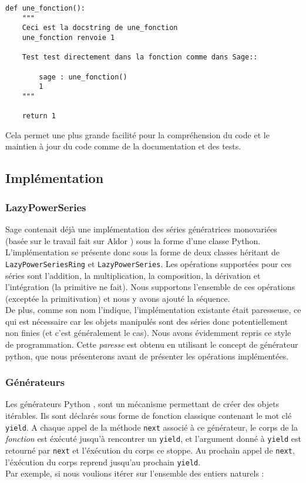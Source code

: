 \documentclass[12pt]{article}
\begin{document}
\noindent\begin{minipage}{\linewidth}
\begin{lstlisting}
def une_fonction():
    """
    Ceci est la docstring de une_fonction
    une_fonction renvoie 1
    
    Test test directement dans la fonction comme dans Sage::

        sage : une_fonction()
        1
    """

    return 1
\end{lstlisting}
\end{minipage}
Cela permet une plus grande facilité pour la compréhension du code et le
maintien à jour du code comme de la documentation et des tests.


\subsection{Implémentation}

\subsubsection{LazyPowerSeries}
Sage contenait déjà une implémentation des séries génératrices monovariées
(basée sur le travail fait sur Aldor
\cite{Hemmecke+Rubey:Aldor-Combinat:2006}) sous la forme d'une classe
Python. L'implémentation se présente donc sous la forme de deux classes
héritant de \verb|LazyPowerSeriesRing| et \verb|LazyPowerSeries|. Les
opérations supportées pour ces séries sont l'addition, la multiplication, la
composition, la dérivation et l'intégration (la primitive ne fait). Nous
supportons l'ensemble de ces opérations (exceptée la primitivation) et nous y
avons ajouté la séquence.\\
De plus, comme son nom l'indique, l'implémentation existante était paresseuse, ce qui est
nécessaire car les objets manipulés sont des séries donc potentiellement non
finies (et c'est généralement le cas). Nous avons évidemment repris ce style
de programmation. Cette \emph{paresse} est obtenu en utilisant le concept de
générateur python, que nous présenterons avant de présenter les opérations
implémentées.

\subsubsection{Générateurs}
Les générateurs Python \cite{genpython}, sont un mécanisme permettant de créer
des objets itérables. Ils sont déclarés sous forme de fonction classique
contenant le mot clé \verb|yield|. A chaque appel de la méthode \verb|next|
associé à ce générateur, le corps de la \emph{fonction} est éxécuté jusqu'à
rencontrer un \verb|yield|, et l'argument donné à \verb|yield| est retourné
par \verb|next| et l'éxécution du corps ce stoppe. Au prochain appel de
\verb|next|, l'éxécution du corps reprend jusqu'au prochain \verb|yield|. \\
Par exemple, si nous voulions itérer sur l'ensemble des entiers naturels :
\end{document}
